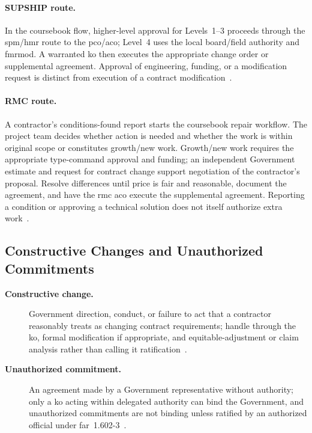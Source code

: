 \documentclass[../main.tex]{subfiles}
\begin{document}
\paragraph{SUPSHIP route.} In the coursebook flow, higher-level approval for Levels~1--3 proceeds through the \ac{spm}/\ac{hmr} route to the \ac{pco}/\ac{aco}; Level~4 uses the local board/field authority and \ac{fmrmod}. A warranted \ac{ko} then executes the appropriate change order or supplemental agreement. Approval of engineering, funding, or a modification request is distinct from execution of a contract modification~\autocite{edo-3-2-6-contract-administration-2025}.

\paragraph{RMC route.} A contractor's conditions-found report starts the coursebook repair workflow. The project team decides whether action is needed and whether the work is within original scope or constitutes growth/new work. Growth/new work requires the appropriate type-command approval and funding; an independent Government estimate and request for contract change support negotiation of the contractor's proposal. Resolve differences until price is fair and reasonable, document the agreement, and have the \ac{rmc} \ac{aco} execute the supplemental agreement. Reporting a condition or approving a technical solution does not itself authorize extra work~\autocite{edo-3-2-6-contract-administration-2025}.

\subsection{Constructive Changes and Unauthorized Commitments}
\begin{description}
  \item[\textbf{Constructive change.}] Government direction, conduct, or failure to act that a contractor reasonably treats as changing contract requirements; handle through the \ac{ko}, formal modification if appropriate, and equitable-adjustment or claim analysis rather than calling it ratification~\autocite{edo-3-2-6-contract-administration-2025,FAR-1-602-2-Responsibilities,FAR-43-103-Contract-Modifications}.
  \item[\textbf{Unauthorized commitment.}] An agreement made by a Government representative without authority; only a \ac{ko} acting within delegated authority can bind the Government, and unauthorized commitments are not binding unless ratified by an authorized official under \ac{far}~1.602-3~\autocite{FAR-1-602-3-Ratification,edo-3-2-6-contract-administration-2025}.
\end{description}
\end{document}
